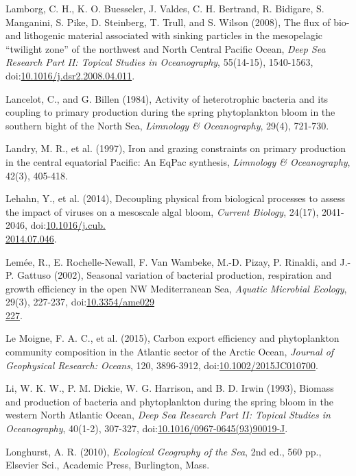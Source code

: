 \begin{singlespace}
{{Lamborg, C. H., K. O. Buesseler, J. Valdes, C. H. Bertrand, R. Bidigare, S. Manganini, S. Pike, D. Steinberg, T. Trull, and S. Wilson (2008), The flux of bio- and lithogenic material associated with sinking particles in the mesopelagic ``twilight zone'' of the northwest and North Central Pacific Ocean, \emph{Deep Sea Research Part II: Topical Studies in Oceanography}, 55(14-15), 1540-1563, doi:\href{http://dx.doi.org/10.1016/j.dsr2.2008.04.011}{10.1016/j.dsr2.2008.04.011}.

Lancelot, C., and G. Billen (1984), Activity of heterotrophic bacteria and its coupling to primary production during the spring phytoplankton bloom in the southern bight of the North Sea, \emph{Limnology \& Oceanography}, 29(4), 721-730.

Landry, M. R., et al. (1997), Iron and grazing constraints on primary production in the central equatorial Pacific: An EqPac synthesis, \emph{Limnology \& Oceanography}, 42(3), 405-418.

Lehahn, Y., et al. (2014), Decoupling physical from biological processes to assess the impact of viruses on a mesoscale algal bloom, \emph{Current Biology}, 24(17), 2041-2046, doi:\href{http://dx.doi.org/10.1016/j.cub.2014.07.046}{10.1016/j.cub.\\2014.07.046}.

Lem\'{e}e, R., E. Rochelle-Newall, F. Van Wambeke, M.-D. Pizay, P. Rinaldi, and J.-P. Gattuso (2002), Seasonal variation of bacterial production, respiration and growth efficiency in the open NW Mediterranean Sea, \emph{Aquatic Microbial Ecology}, 29(3), 227-237, doi:\href{http://dx.doi.org/10.3354/ame029227}{10.3354/ame029\\227}.

Le Moigne, F. A. C., et al. (2015), Carbon export efficiency and phytoplankton community composition in the Atlantic sector of the Arctic Ocean, \emph{Journal of Geophysical Research: Oceans}, 120, 3896-3912, doi:\href{http://dx.doi.org/10.1002/2015JC010700}{10.1002/2015JC010700}.

Li, W. K. W., P. M. Dickie, W. G. Harrison, and B. D. Irwin (1993), Biomass and production of bacteria and phytoplankton during the spring bloom in the western North Atlantic Ocean, \emph{Deep Sea Research Part II: Topical Studies in Oceanography}, 40(1-2), 307-327, doi:\href{http://dx.doi.org/10.1016/0967-0645\%2893\%2990019-J}{10.1016/0967-0645(93)90019-J}.

Longhurst, A. R. (2010), \emph{Ecological Geography of the Sea}, 2nd ed., 560 pp., Elsevier Sci., Academic Press, Burlington, Mass.

}}
\end{singlespace}
